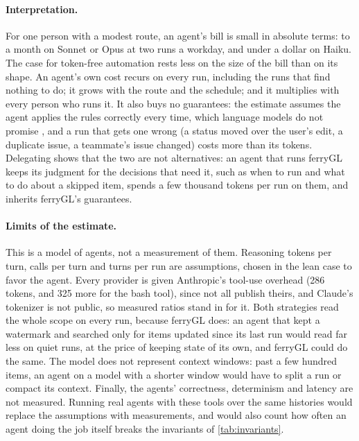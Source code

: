\documentclass[11pt,a4paper]{article}
\newcommand{\ferry}{ferryGL}
\begin{document}
\paragraph{Interpretation.} For one person with a modest route, an agent's bill is small in
absolute terms: \MonthLeanSonnetHundred{} to \MonthPlausibleOpusHundred{} a month on Sonnet or
Opus at two runs a workday, and under a dollar on Haiku. The case for token-free automation
rests less on the size of the bill than on its shape. An agent's own cost recurs on every run,
including the runs that find nothing to do; it grows with the route and the schedule; and it
multiplies with every person who runs it. It also buys no guarantees: the estimate assumes the
agent applies the rules correctly every time, which language models do not promise
\cite{ouyang2025empirical, atil2025nondeterminism}, and a run that gets one wrong (a status
moved over the user's edit, a duplicate issue, a teammate's issue changed) costs more than its
tokens. Delegating shows that the two are not alternatives: an agent that runs \ferry{} keeps its
judgment for the decisions that need it, such as when to run and what to do about a skipped
item, spends a few thousand tokens per run on them, and inherits \ferry's guarantees.

\paragraph{Limits of the estimate.} This is a model of agents, not a measurement of them.
Reasoning tokens per turn, calls per turn and turns per run are assumptions, chosen in the lean
case to favor the agent. Every provider is given Anthropic's tool-use overhead (286 tokens, and
325 more for the bash tool), since not all publish theirs, and Claude's tokenizer is not public,
so measured ratios stand in for it. Both strategies read the whole scope on every run, because
\ferry{} does: an agent that kept a watermark and searched only for items updated since its
last run would read far less on quiet runs, at the price of keeping state of its own, and
\ferry{} could do the same. The model does not represent context windows: past a few hundred
items, an agent on a model with a shorter window would have to split a run or compact its
context. Finally, the agents'
correctness, determinism and latency are not measured. Running real agents with these tools
over the same histories would replace the assumptions with measurements, and would also count
how often an agent doing the job itself breaks the invariants of \cref{tab:invariants}.
\end{document}
